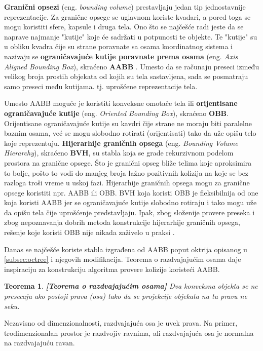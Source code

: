 \documentclass[12pt,oneside]{memoir}
\newtheorem{teo}{Teorema}[section]
\begin{document}
\textbf{Granični opsezi} (eng. {\em bounding volume}) prestavljaju jedan tip jednostavnije reprezentacije.
Za granične opsege se uglavnom koriste kvadari, a pored toga se mogu koristiti sfere, kapsule i druga tela.
Ono što se najčešće radi jeste da se naprave najmanje "kutije" koje će sadržati u potpunosti te objekte.
Te "kutije" su u obliku kvadra čije su strane poravnate sa osama koordinatnog sistema i nazivaju se
\textbf{ograničavajuće kutije poravnate prema osama} (eng. {\em Axis Aligned Bounding Box}), skraćeno \textbf{ AABB }.
Umesto da se računaju preseci između velikog broja prostih objekata od kojih su tela sastavljena, sada se posmatraju 
samo preseci među kutijama. tj. uprošćene reprezentacije tela.

Umesto AABB moguće je koristiti konveksne omotače tela ili \textbf{orijentisane ograničavajuće kutije} (eng. {\em Oriented Bounding Box}), skraćeno \textbf{OBB}.
Orijentisane ograničavajuće kutije su kavdri čije strane ne moraju biti paralelne baznim osama, 
već se mogu slobodno rotirati (orijentisati) tako da uže opišu telo koje reprezentuju.
\textbf{Hijerarhije graničnih opsega} (eng. {\em Bounding Volume Hierarchy}), skraćeno \textbf{BVH}, su stabla koja se grade rekurzivnom podelom 
prostora na granične opsege. Što je granični opseg bliže telima koje aproksimira to bolje, pošto to vodi do manjeg broja 
lažno pozitivnih kolizija na koje se bez razloga troši vreme u uskoj fazi. 
Hijerarhije graničnih opsega mogu za granične opsege koristiti npr. AABB ili OBB.
BVH koja koristi OBB je fleksibilnija od one koja koristi AABB jer se ograničavajuće kutije slobodno rotiraju 
i tako mogu uže da opišu tela čije uprošćenje predstavljaju. 
Ipak, zbog složenije provere preseka i zbog nepoznavanja dobrih metoda konstrukcije hijerarhije graničnih
opsega, rešenje koje koristi OBB nije nikada zaživelo u praksi \cite{obb}. 

Danas se najčešće koriste stabla izgrađena od AABB poput oktrija opisanog u \ref{subsec:octree} i njegovih modifikacija. 
Teorema o razdvajajućim osama daje inspiraciju za konstrukciju algoritma provere kolizije koristeći AABB.

\begin{teo}
	\textbf{[Teorema o razdvajajućim osama]}
	\label{teo:sat}
	Dva konveksna objekta se ne presecaju ako postoji prava (osa) 
	tako da se projekcije objekata na tu pravu ne seku.
\end{teo}

Nezavisno od dimenzionalnosti, razdvajajuća osa je uvek prava. Na primer, trodimenzionalan prostor
je razdvojiv ravnima, ali razdvajajuća osa je normalna na razdvajajuću ravan.
\end{document}
